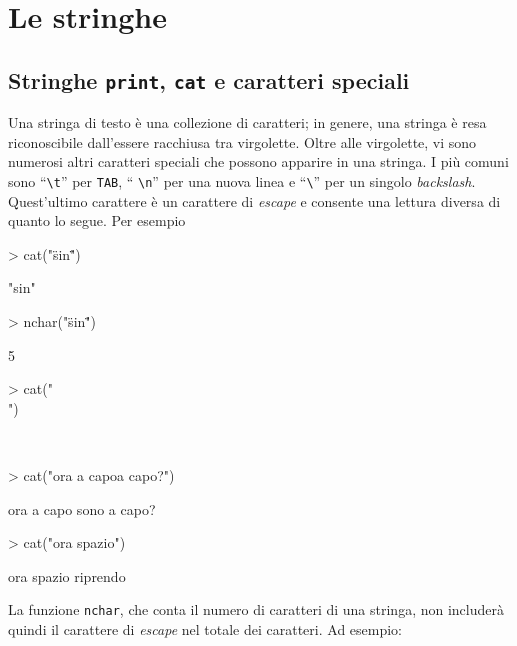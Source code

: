 \documentclass[onecolumn,11pt]{book}
\begin{document}
\section{Le stringhe}
\subsection{Stringhe \texttt{print}, \texttt{cat} e caratteri speciali}
Una stringa di testo \`e una collezione di caratteri; in genere, una stringa \`e resa riconoscibile dall'essere racchiusa tra virgolette. 
Oltre alle virgolette, vi sono numerosi altri caratteri speciali che possono apparire in una stringa. 
I pi\`u comuni sono ``\texttt{\textbackslash t}'' per \texttt{TAB}, `` \texttt{\textbackslash n}'' per una nuova linea e ``\texttt{\textbackslash }'' per un singolo {\it backslash}. 
Quest'ultimo carattere \`e un carattere di \emph{escape} e consente una lettura diversa di quanto lo segue.  Per esempio
\begin{Schunk}
\begin{Sinput}
> cat("\"sin\"")
\end{Sinput}
\begin{Soutput}
"sin"
\end{Soutput}
\begin{Sinput}
> nchar("\"sin\"")
\end{Sinput}
\begin{Soutput}
[1] 5
\end{Soutput}
\begin{Sinput}
> cat("\\")
\end{Sinput}
\begin{Soutput}
\
\end{Soutput}
\begin{Sinput}
> cat("ora a capo\nsono a capo?")
\end{Sinput}
\begin{Soutput}
ora a capo
sono a capo?
\end{Soutput}
\begin{Sinput}
> cat("ora spazio\triprendo")
\end{Sinput}
\begin{Soutput}
ora spazio	riprendo
\end{Soutput}
\end{Schunk}
La funzione \texttt{nchar},  che conta il numero di caratteri di una stringa, non includer\`a quindi il carattere di \emph{escape} nel totale dei caratteri. Ad esempio:
\end{document}
